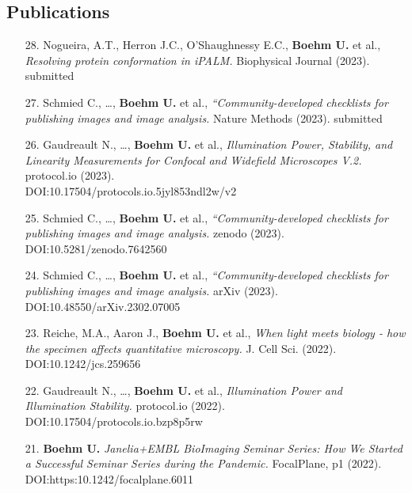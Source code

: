 \documentclass[margin,line]{res}
\begin{document}
\begin{resume}
\clearpage


\section{\sc Publications}

\begin{enumerate}[leftmargin=*]

\item[28.] Nogueira, A.T., Herron J.C., O’Shaughnessy E.C., {\bf Boehm U.} et al., {\it Resolving protein conformation in iPALM.} Biophysical Journal (2023). submitted

\item[27.] Schmied C., \dots, {\bf Boehm U.} et al., {\it “Community-developed checklists for publishing images and image analysis.} Nature Methods (2023). submitted

\item[26.] Gaudreault N., \dots, {\bf Boehm U.} et al., {\it  Illumination Power, Stability, and Linearity Measurements for Confocal and Widefield Microscopes V.2.} protocol.io (2023). \\DOI:10.17504/protocols.io.5jyl853ndl2w/v2

\item[25.] Schmied C., \dots, {\bf Boehm U.} et al., {\it “Community-developed checklists for publishing images and image analysis.} zenodo  (2023). DOI:10.5281/zenodo.7642560

\item[24.] Schmied C., \dots, {\bf Boehm U.} et al., {\it “Community-developed checklists for publishing images and image analysis.} arXiv (2023). DOI:10.48550/arXiv.2302.07005

\item[23.] Reiche, M.A., Aaron J., {\bf Boehm U.} et al., {\it When light meets biology - how the specimen affects quantitative microscopy.} J. Cell Sci. (2022). DOI:10.1242/jcs.259656

\item[22.] Gaudreault N., \dots, {\bf Boehm U.} et al., {\it Illumination Power and Illumination Stability.} protocol.io (2022). DOI:10.17504/protocols.io.bzp8p5rw

\item[21.] {\bf Boehm U.} {\it Janelia+EMBL BioImaging Seminar Series: How We Started a Successful Seminar Series during the Pandemic.} FocalPlane, p1 (2022). DOI:https:10.1242/focalplane.6011



\end{enumerate}
\end{resume}
\end{document}
